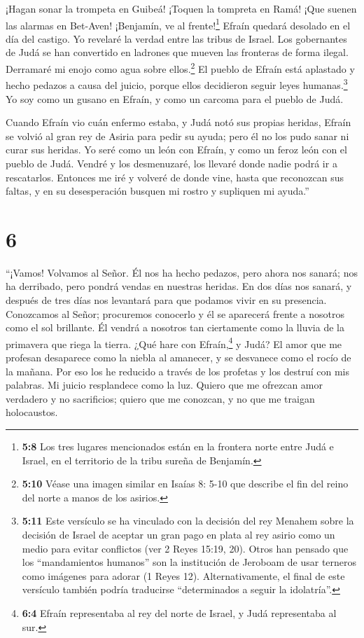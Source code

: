  ¡Hagan sonar la trompeta en Guibeá! ¡Toquen la tompreta en
Ramá! ¡Que suenen las alarmas en Bet-Aven! ¡Benjamín, ve al
frente!\footnote{\textbf{5:8} Los tres lugares mencionados están en la
  frontera norte entre Judá e Israel, en el territorio de la tribu
  sureña de Benjamín.}  Efraín quedará desolado en el día
del castigo. Yo revelaré la verdad entre las tribus de Israel.
 Los gobernantes de Judá se han convertido en ladrones que
mueven las fronteras de forma ilegal. Derramaré mi enojo como agua sobre
ellos.\footnote{\textbf{5:10} Véase una imagen similar en Isaías 8: 5-10
  que describe el fin del reino del norte a manos de los asirios.}
 El pueblo de Efraín está aplastado y hecho pedazos a causa
del juicio, porque ellos decidieron seguir leyes humanas.\footnote{\textbf{5:11}
  Este versículo se ha vinculado con la decisión del rey Menahem sobre
  la decisión de Israel de aceptar un gran pago en plata al rey asirio
  como un medio para evitar conflictos (ver 2 Reyes 15:19, 20). Otros
  han pensado que los ``mandamientos humanos'' son la institución de
  Jeroboam de usar terneros como imágenes para adorar (1 Reyes 12).
  Alternativamente, el final de este versículo también podría traducirse
  ``determinados a seguir la idolatría''.}  Yo soy como un
gusano en Efraín, y como un carcoma para el pueblo de Judá.

 Cuando Efraín vio cuán enfermo estaba, y Judá notó sus
propias heridas, Efraín se volvió al gran rey de Asiria para pedir su
ayuda; pero él no los pudo sanar ni curar sus heridas.  Yo
seré como un león con Efraín, y como un feroz león con el pueblo de
Judá. Vendré y los desmenuzaré, los llevaré donde nadie podrá ir a
rescatarlos.  Entonces me iré y volveré de donde vine,
hasta que reconozcan sus faltas, y en su desesperación busquen mi rostro
y supliquen mi ayuda.''

\hypertarget{section-5}{%
\section{6}\label{section-5}}

 ``¡Vamos! Volvamos al Señor. Él nos ha hecho pedazos, pero
ahora nos sanará; nos ha derribado, pero pondrá vendas en nuestras
heridas.  En dos días nos sanará, y después de tres días nos
levantará para que podamos vivir en su presencia. 
Conozcamos al Señor; procuremos conocerlo y él se aparecerá frente a
nosotros como el sol brillante. Él vendrá a nosotros tan ciertamente
como la lluvia de la primavera que riega la tierra.  ¿Qué
hare con Efraín,\footnote{\textbf{6:4} Efraín representaba al rey del
  norte de Israel, y Judá representaba al sur.} y Judá? El amor que me
profesan desaparece como la niebla al amanecer, y se desvanece como el
rocío de la mañana.  Por eso los he reducido a través de los
profetas y los destruí con mis palabras. Mi juicio resplandece como la
luz.  Quiero que me ofrezcan amor verdadero y no
sacrificios; quiero que me conozcan, y no que me traigan holocaustos.

